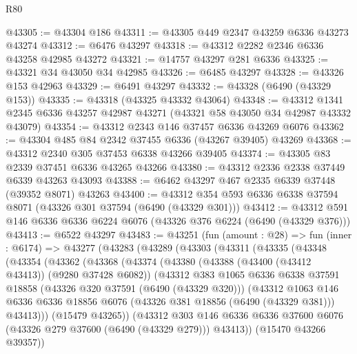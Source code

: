 \begin{lexlean}{R80}
\begin{coremodule}
@43305 := @43304 @186
@43311 := @43305 @449 @2347 @43259 @6336 @43273 @43274
@43312 := @6476 @43297
@43318 := @43312 @2282 @2346 @6336 @43258 @42985 @43272
@43321 := @14757 @43297 @281 @6336
@43325 := @43321 @34 @43050 @34 @42985
@43326 := @6485 @43297
@43328 := @43326 @153 @42963
@43329 := @6491 @43297
@43332 := @43328 (@6490 (@43329 @153))
@43335 := @43318 (@43325 @43332 @43064)
@43348 := @43312 @1341 @2345 @6336 @43257 @42987 @43271 (@43321 @58 @43050 @34 @42987 @43332 @43079)
@43354 := @43312 @2343 @146 @37457 @6336 @43269 @6076
@43362 := @43304 @485 @84 @2342 @37455 @6336 (@43267 @39405) @43269
@43368 := @43312 @2340 @305 @37453 @6338 @43266 @39405
@43374 := @43305 @83 @2339 @37451 @6336 @43265 @43266
@43380 := @43312 @2336 @2338 @37449 @6339 @43263 @43093
@43388 := @6462 @43297 @467 @2335 @6339 @37448 (@39352 @8071) @43263
@43400 := @43312 @354 @593 @6336 @6338 @37594 @8071 (@43326 @301 @37594 (@6490 (@43329 @301)))
@43412 := @43312 @591 @146 @6336 @6336 @6224 @6076 (@43326 @376 @6224 (@6490 (@43329 @376)))
@43413 := @6522 @43297
@43483 := @43251
    (fun (amount : @28) =>
    fun (inner : @6174) =>
    @43277
      (@43283
        (@43289
          (@43303
            (@43311
              (@43335
                (@43348
                  (@43354
                    (@43362
                      (@43368
                        (@43374
                          (@43380
                            (@43388 (@43400 (@43412 @43413)) (@9280 @37428 @6082))
                            (@43312
                              @383
                              @1065
                              @6336
                              @6338
                              @37591
                              @18858
                              (@43326 @320 @37591 (@6490 (@43329 @320)))
                              (@43312
                                @1063
                                @146
                                @6336
                                @6336
                                @18856
                                @6076
                                (@43326 @381 @18856 (@6490 (@43329 @381)))
                                @43413)))
                          (@15479 @43265))
                        (@43312
                          @303
                          @146
                          @6336
                          @6336
                          @37600
                          @6076
                          (@43326 @279 @37600 (@6490 (@43329 @279)))
                          @43413))
                      (@15470 @43266 @39357))

\end{coremodule}
\end{lexlean}
